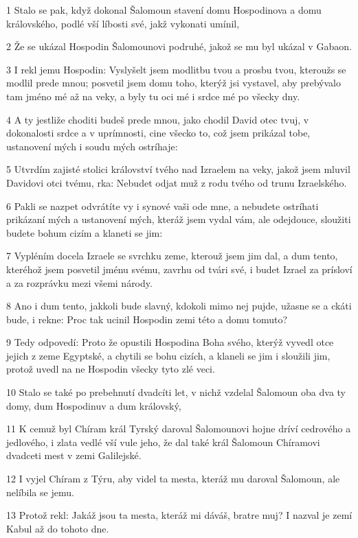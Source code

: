\par 1 Stalo se pak, když dokonal Šalomoun stavení domu Hospodinova a domu královského, podlé vší líbosti své, jakž vykonati umínil,
\par 2 Že se ukázal Hospodin Šalomounovi podruhé, jakož se mu byl ukázal v Gabaon.
\par 3 I rekl jemu Hospodin: Vyslyšelt jsem modlitbu tvou a prosbu tvou, kteroužs se modlil prede mnou; posvetil jsem domu toho, kterýž jsi vystavel, aby prebývalo tam jméno mé až na veky, a byly tu oci mé i srdce mé po všecky dny.
\par 4 A ty jestliže choditi budeš prede mnou, jako chodil David otec tvuj, v dokonalosti srdce a v uprímnosti, cine všecko to, což jsem prikázal tobe, ustanovení mých i soudu mých ostríhaje:
\par 5 Utvrdím zajisté stolici království tvého nad Izraelem na veky, jakož jsem mluvil Davidovi otci tvému, rka: Nebudet odjat muž z rodu tvého od trunu Izraelského.
\par 6 Pakli se nazpet odvrátíte vy i synové vaši ode mne, a nebudete ostríhati prikázaní mých a ustanovení mých, kteráž jsem vydal vám, ale odejdouce, sloužiti budete bohum cizím a klaneti se jim:
\par 7 Vypléním docela Izraele se svrchku zeme, kterouž jsem jim dal, a dum tento, kteréhož jsem posvetil jménu svému, zavrhu od tvári své, i budet Izrael za prísloví a za rozprávku mezi všemi národy.
\par 8 Ano i dum tento, jakkoli bude slavný, kdokoli mimo nej pujde, užasne se a ckáti bude, i rekne: Proc tak ucinil Hospodin zemi této a domu tomuto?
\par 9 Tedy odpovedí: Proto že opustili Hospodina Boha svého, kterýž vyvedl otce jejich z zeme Egyptské, a chytili se bohu cizích, a klaneli se jim i sloužili jim, protož uvedl na ne Hospodin všecky tyto zlé veci.
\par 10 Stalo se také po prebehnutí dvadcíti let, v nichž vzdelal Šalomoun oba dva ty domy, dum Hospodinuv a dum královský,
\par 11 K cemuž byl Chíram král Tyrský daroval Šalomounovi hojne dríví cedrového a jedlového, i zlata vedlé vší vule jeho, že dal také král Šalomoun Chíramovi dvadceti mest v zemi Galilejské.
\par 12 I vyjel Chíram z Týru, aby videl ta mesta, kteráž mu daroval Šalomoun, ale nelíbila se jemu.
\par 13 Protož rekl: Jakáž jsou ta mesta, kteráž mi dáváš, bratre muj? I nazval je zemí Kabul až do tohoto dne.
